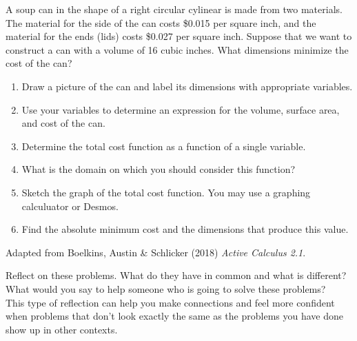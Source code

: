 \documentclass{ximera}
\begin{document}
\begin{exercise}
    A soup can in the shape of a right circular cylinear is made from two materials.  The material for the side of the can costs \$0.015 per square inch, and the material for the ends (lids) costs \$0.027 per square inch.  Suppose that we want to construct a can with a volume of 16 cubic inches.  What dimensions minimize the cost of the can? 
    \begin{enumerate}
        \item Draw a picture of the can and label its dimensions with appropriate variables.
        \item Use your variables to determine an expression for the volume, surface area, and cost of the can.
        \item Determine the total cost function as a function of a single variable.
        \item What is the domain on which you should consider this function?
        \item Sketch the graph of the total cost function.  You may use a graphing calculuator or Desmos. 
        \item Find the absolute minimum cost and the dimensions that produce this value.
    \end{enumerate}
    Adapted from Boelkins, Austin \& Schlicker (2018) \textit{Active Calculus 2.1}.
\end{exercise}

\begin{exercise}
    Reflect on these problems.  What do they have in common and what is different?  What would you say to help someone who is going to solve these problems? \\
    This type of reflection can help you make connections and feel more confident when problems that don't look exactly the same as the problems you have done show up in other contexts.
\end{exercise}
\end{document}
